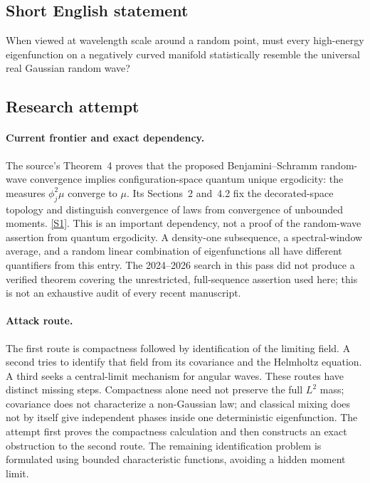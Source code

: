 \documentclass[11pt,a4paper]{article}
\newcommand{\sref}[2]{\hyperlink{source:#1:#2}{[S#2]}}
\numberwithin{equation}{section}
\begin{document}
\subsection{Short English statement}
When viewed at wavelength scale around a random point, must every high-energy eigenfunction on a negatively curved manifold statistically resemble the universal real Gaussian random wave?
\subsection{Research attempt}

\paragraph{Current frontier and exact dependency.}
The source's Theorem~4 proves that the proposed Benjamini--Schramm
random-wave convergence implies configuration-space quantum unique
ergodicity: the measures $\phi_j^2\mu$ converge to $\mu$. Its
Sections~2 and~4.2 fix the decorated-space topology and distinguish
convergence of laws from convergence of unbounded moments.
\sref{30006801}{1}. This is an important dependency, not a proof of the
random-wave assertion from quantum ergodicity. A density-one subsequence,
a spectral-window average, and a random linear combination of
eigenfunctions all have different quantifiers from this entry.
The 2024--2026 search in this pass did not produce a verified theorem
covering the unrestricted, full-sequence assertion used here; this is
not an exhaustive audit of every recent manuscript.

\paragraph{Attack route.}
The first route is compactness followed by identification of the limiting
field. A second tries to identify that field from its covariance and the
Helmholtz equation. A third seeks a central-limit mechanism for angular
waves. These routes have distinct missing steps. Compactness alone need
not preserve the full $L^2$ mass; covariance does not characterize a
non-Gaussian law; and classical mixing does not by itself give independent
phases inside one deterministic eigenfunction. The attempt first proves
the compactness calculation and then constructs an exact obstruction to
the second route. The remaining identification problem is formulated
using bounded characteristic functions, avoiding a hidden moment limit.
\end{document}
